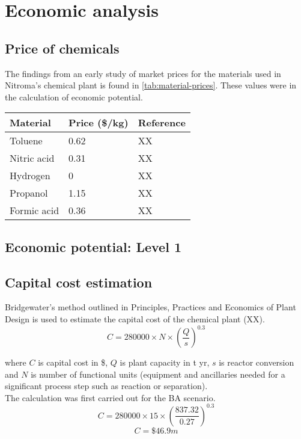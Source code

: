 \section{Economic analysis}
\label{app:economics}
\subsection{Price of chemicals}

The findings from an early study of market prices for the materials used in Nitroma's chemical plant is found in \cref{tab:material-prices}. These values were in the calculation of economic potential.

\begin{table}[]
\begin{tabular}{lll}
    \hline
    Material    & Price (\$/kg) & Reference \\ \hline
    Toluene     & 0.62          & XX        \\
    Nitric acid & 0.31          & XX        \\
    Hydrogen    & 0             & XX        \\
    Propanol    & 1.15          & XX        \\
    Formic acid & 0.36          & XX        \\ \hline
\end{tabular}
\end{table}

\subsection{Economic potential: Level 1}

\subsection{Capital cost estimation}

Bridgewater's method outlined in Principles, Practices and Economics of Plant Design is used to estimate the capital cost of the chemical plant (XX).
\begin{equation}
    C=280000 \times N \times (\frac{Q}{s})^0.3
\end{equation}

where $C$ is capital cost in \$, $Q$ is  plant capacity in t yr, $s$ is reactor conversion and $N$ is number of functional units (equipment and ancillaries needed for a significant process step such as reaction or separation).\\
The calculation was first carried out for the BA scenario.
\begin{equation}
    C=280000 \times 15 \times (\frac{837.32}{0.27})^0.3
\end{equation}
\begin{equation}
    C=\$46.9m
\end{equation}
    
